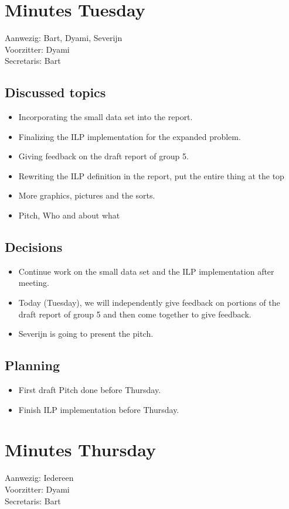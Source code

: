 \documentclass{article}
\begin{document}
\section*{Minutes Tuesday}
Aanwezig: Bart, Dyami, Severijn \\
Voorzitter: Dyami \\
Secretaris: Bart

\subsection*{Discussed topics}
\begin{itemize}
    \item Incorporating the small data set into the report.
    \item Finalizing the ILP implementation for the expanded problem.
    \item Giving feedback on the draft report of group 5.
    \item Rewriting the ILP definition in the report, put the entire thing at the top
    \item More graphics, pictures and the sorts.
    \item {Pitch, Who and about what}
\end{itemize}

\subsection*{Decisions}
\begin{itemize}
    \item Continue work on the small data set and the ILP implementation after meeting.
    \item Today (Tuesday), we will independently give feedback on portions of the draft report of group 5 and then come together to give feedback.
    \item Severijn is going to present the pitch.
\end{itemize}

\subsection*{Planning}
\begin{itemize}
    \item First draft Pitch done before Thursday.
    \item Finish ILP implementation before Thursday.
\end{itemize}

\section*{Minutes Thursday}
Aanwezig: Iedereen \\
Voorzitter: Dyami \\ 
Secretaris: Bart \\
\end{document}
